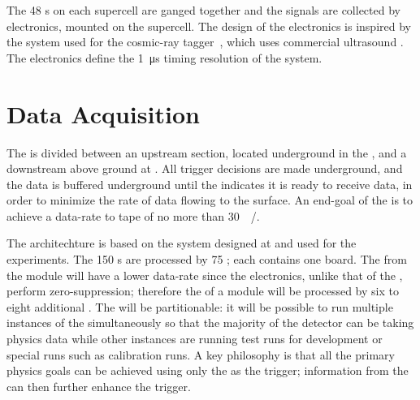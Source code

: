 The 48 s on each  supercell are ganged together and the signals are collected by  electronics, mounted on the supercell. The design of the   electronics is inspired by the system used for the  cosmic-ray tagger~\cite{bib:mu2e_tdr}, which uses commercial ultrasound . The  electronics define the \SI{1}{\micro\second} timing resolution of the  system.



\section{Data Acquisition}
\label{sec:exec-sp-daq}


The  is divided between an upstream section, located underground in the , and a downstream  above ground at . All trigger decisions are made underground, and the data is buffered underground until the  indicates it is ready to receive data, in order to minimize the rate of data flowing to the surface. An end-goal of the  is to achieve a data-rate to tape of no more than \SI{30}{\peta\byte/\year}.

The  architechture is based on the  system designed at  and used for the  
experiments. The 150 s are processed by 75 ; each  contains one  board. The  from the module will have a lower data-rate since the  electronics, unlike that of the , perform zero-suppression; therefore the  of a module will be processed by six to eight additional . The  will be partitionable: it will be possible to run multiple instances of the  simultaneously so that the majority of the detector can be taking physics data while other  instances are running test runs for development or special runs such as calibration runs. A key philosophy is that all the primary  physics goals can be achieved using only the  as the trigger; information from the  can then further enhance the trigger.

